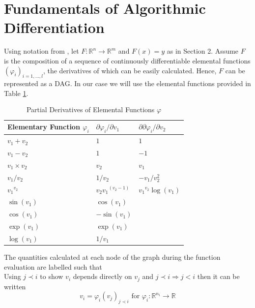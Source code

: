 \documentclass{article}
\begin{document}
\section{Fundamentals of Algorithmic Differentiation}

Using notation from \cite{evald}, let $F: \mathbb{R}^n \rightarrow \mathbb{R}^m$ and $F(x) = y$ as in Section 2. Assume $F$ is the composition of a sequence of continuously differentiable elemental functions $(\varphi_i)_{i=1,\ldots, l}$, the derivatives of which can be easily calculated. Hence, $F$ can be represented as a DAG. In our case we will use the elemental functions provided in Table \ref{tab:elemental}.

\begin{table}[h]
    \centering
    \begin{tabular}{|lll|}
        \hline
        Elementary Function $\varphi_i$ & $\partial \varphi_i / \partial {v}_1$ & $\partial \partial \varphi_i / \partial {v}_2$ \\
        \hline
        $v_1+v_2$ & $1$ & $1$ \\
        $v_1-v_2$ & $1$ & $-1$ \\
        $v_1 \times v_2$ & $v_2$ & $v_1$ \\
        $v_1 / v_2$ & $1/v_2$ & $-v_1/v_2^2$ \\
        ${v_1}^{v_2}$ & $v_2{v_1}^{(v_2-1)}$ & ${v_1}^{v_2}\log(v_1)$ \\
        \hdashline
        $\sin(v_1)$ & $\cos(v_1)$ & \\
        $\cos(v_1)$ & $-\sin(v_1)$ & \\
        $\exp(v_1)$ & $\exp(v_1)$ & \\
        $\log(v_1)$ & $1/v_1$ & \\
        \hline
    \end{tabular}
    \caption{Partial Derivatives of Elemental Functions $\varphi$}
    \label{tab:elemental}
\end{table}

The quantities calculated at each node of the graph during the function evaluation are labelled such that
\begin{equation}
    [ \underbrace{v_{1-n}, \ldots, v_0}_{x} , v_1, \ldots, v_{l-m}, \underbrace{v_{l-m+1}, \ldots, v_l}_{y}]
\end{equation}
Using $j \prec i$ to show $v_i$ depends directly on $v_j$ and $j \prec i \Longrightarrow j < i$ then it can be written
\begin{equation}
    v_i = \varphi_i (v_j)_{j \prec i} \text{ for } \varphi_i : \mathbb{R}^{n_i} \longrightarrow \mathbb{R}
\end{equation}
\end{document}

